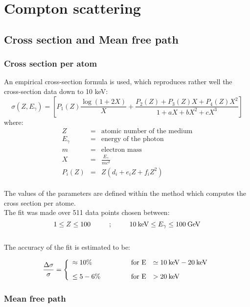 
\chapter[Compton scattering]{Compton scattering}
\section{Cross section and Mean free path}
\subsection{Cross section per atom}
An empirical cross-section formula is used,
which reproduces rather well the cross-section data down to 10 keV:
\[
\sigma(Z,E_{\gamma}) = \left [ P_{1}(Z) \frac{\log(1+2X)}{X} +
\frac{P_{2}(Z)+P_{3}(Z) X + P_{4}(Z) X^{2}}{1+aX+bX^{2}+cX^{3}} \right ] 
\]
where:
\begin{eqnarray*}
Z          & = & \mbox{atomic number of the medium} \\
E_{\gamma} & = & \mbox{energy of the photon}  \\
m          & = & \mbox{electron mass}  \\
X          & = & \frac{E_{\gamma}}{mc^2}  \\
P_{i}(Z)   & = & Z (d_{i} + e_{i}Z + f_{i}Z^{2})
\end{eqnarray*}
\\ 
The values of the parameters are defined within the method which computes
the cross section per atome.
\\
The fit was made over 511 data points chosen between:
\[
1 \leq Z \leq 100 \makebox[2cm]{;} 10 \: \mbox{keV} \leq E_{\gamma} \leq 100 \: 
\mbox{GeV}
\]
\\ 
The accuracy of the fit is estimated to be:
 
\vspace{.3cm}
\[
\frac{\Delta\sigma}{\sigma} = \left\{ \begin{array}{lcl}
\approx 10\% & \makebox[2cm][r]{\rm for E} & \simeq 10\: \mbox{keV}-20\: 
\mbox{keV} \vspace{.3cm} \\
\leq 5-6\% & \makebox[2cm][r]{\rm for E} & > 20 \: \mbox{keV}
\end{array} \right.
\]
\subsection{Mean free path}

